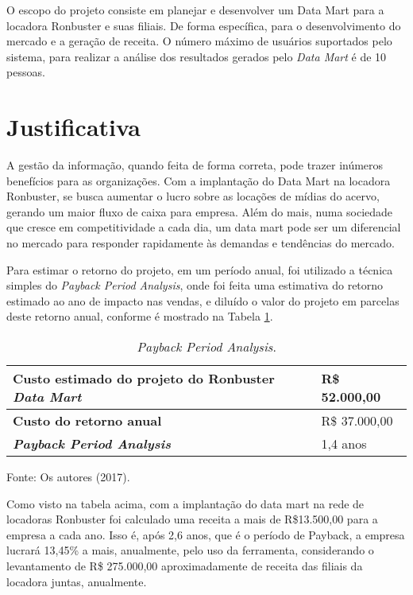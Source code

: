 O escopo do projeto consiste em planejar e 
desenvolver um Data Mart para a locadora Ronbuster 
e suas filiais. De forma específica, para o 
desenvolvimento do mercado e a geração de receita.  
O número máximo de usuários suportados pelo sistema, 
para realizar a análise dos resultados gerados pelo 
\textit{Data Mart} é de 10 pessoas. 


\section{Justificativa}

A gestão da informação, quando feita de forma correta, pode trazer inúmeros benefícios para as organizações. Com a implantação do Data Mart na locadora Ronbuster, se busca aumentar o lucro sobre as locações de mídias do acervo, gerando um maior fluxo de caixa para empresa. Além do mais, numa sociedade que cresce em competitividade a cada dia, um data mart pode ser um diferencial no mercado para responder rapidamente às demandas e tendências do mercado.

Para estimar o retorno do projeto, em um período anual, 
foi utilizado a técnica simples do 
\textit{Payback Period Analysis}, onde foi feita uma 
estimativa do retorno estimado ao ano de 
impacto nas vendas, e diluído o valor do 
projeto em parcelas deste retorno anual, 
conforme é mostrado na Tabela \ref{tab:justificativa}.

\begin{table}[!htb]
    \begin{center}
        \caption{\textit{Payback Period Analysis}.} \label{tab:justificativa}
        \begin{tabular}{ p{6cm} | p{3cm} }
            \hline
            \textbf{Custo estimado do projeto do Ronbuster \textit{Data Mart}} & R\$ 52.000,00 \\
            \hline
            \textbf{Custo do retorno anual} & R\$ 37.000,00 \\
            \hline
            \textbf{\textit{Payback Period Analysis}} & 1,4 anos \\
            \hline
        \end{tabular}
    \end{center}
    Fonte: Os autores (2017).
\end{table}

Como visto na tabela acima, com a implantação do data mart 
na rede de locadoras Ronbuster foi calculado uma receita 
a mais de R\$13.500,00 para a empresa a cada ano. 
Isso é, após 2,6 anos, que é o período de 
Payback, a empresa lucrará 13,45\% a mais, 
anualmente, pelo uso da ferramenta, considerando o 
levantamento de R\$ 275.000,00 aproximadamente de 
receita das filiais da locadora juntas, anualmente.

